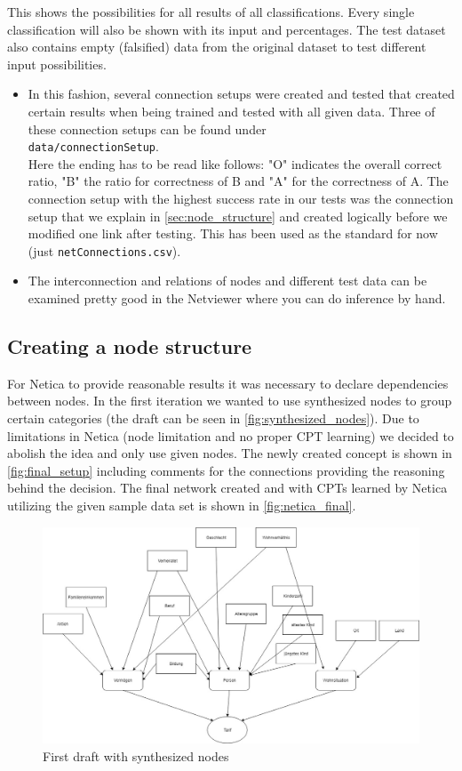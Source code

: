 \documentclass[12pt]{scrartcl}
\begin{document}
This shows the possibilities for all results of all classifications.  Every single classification will also be shown with its input and percentages.
The test dataset also contains empty (falsified) data from the original dataset to test different input possibilities.

\begin{itemize}
    \item In this fashion, several connection setups were created and tested that created certain results when being trained and tested with all given data.
    Three of these connection setups can be found under \\ \texttt{data/connectionSetup}.\\
    Here the ending has to be read like follows: "O" indicates the overall correct ratio, "B" the ratio for correctness of B and "A" for the correctness of A.
    The connection setup with the highest success rate in our tests was the connection setup that we explain in \autoref{sec:node_structure} and created logically before we modified one link after testing.
    This has been used as the standard for now (just \texttt{netConnections.csv}).
    \item The interconnection and relations of nodes and different test data can be examined pretty good in the Netviewer where you can do inference by hand.
\end{itemize}

\subsection{Creating a node structure}
\label{sec:node_structure}
For Netica to provide reasonable results it was necessary to declare dependencies between nodes.
In the first iteration we wanted to use synthesized nodes to group certain categories (the draft can be seen in \autoref{fig:synthesized_nodes}).
Due to limitations in Netica (node limitation and no proper CPT learning) we decided to abolish the idea and only use given nodes.
The newly created concept is shown in \autoref{fig:final_setup} including comments for the connections providing the reasoning behind the decision.
The final network created and with CPTs learned by Netica utilizing the given sample data set is shown in \autoref{fig:netica_final}.

\begin{figure}[H]
    \centering
    \includegraphics[width=.9\textwidth]{img/connectionsV1.jpg}
    \caption{First draft with synthesized nodes}
    \label{fig:synthesized_nodes}
\end{figure}
\end{document}
